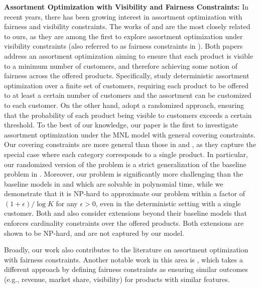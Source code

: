 \documentclass[msom,non-blindrev]{informs3} %
\theoremstyle{definition}
\begin{document}
\noindent\textbf{Assortment Optimization with Visibility and Fairness Constraints:} 
In recent years, there has been growing interest in assortment optimization with fairness and visibility constraints. The works of \cite{barre2023assortment} and \cite{lu2023simple} are the most closely related to ours, as they are among the first to explore assortment optimization under visibility constraints (also referred to as fairness constraints in \cite{lu2023simple}). Both papers address an assortment optimization  aiming to ensure that each product is visible to a minimum number of customers, and therefore achieving some notion of fairness across the offered products. Specifically, \cite{barre2023assortment} study deterministic assortment optimization over a finite set of customers, requiring each product to be offered to at least a certain number of customers and the assortment can be customized to each customer. On the other hand, \cite{lu2023simple} adopt a randomized approach, ensuring that the probability of each product being visible to customers exceeds a certain threshold.
To the best of our knowledge, our paper is the first to investigate assortment optimization under the MNL model with general covering constraints. {  Our covering constraints are more general than  those in \cite{barre2023assortment} and \cite{lu2023simple}, as they capture the special case where each category corresponds to a single product.
In particular, our randomized version of the problem is a strict generalization of the baseline problem in \cite{lu2023simple}. %
Moreover, our problem is significantly more challenging than the baseline models in \cite{barre2023assortment} and \cite{lu2023simple} which are solvable in polynomial time, while we demonstrate that it is NP-hard to approximate our problem within a factor of $(1+\epsilon)/\log K$ for any $\epsilon>0$, even in the deterministic setting with a single customer. Both \cite{barre2023assortment} and \cite{lu2023simple} also consider extensions beyond their baseline models that enforces cardinality constraints over the offered products. Both extensions are shown to be NP-hard, and are not captured by our model.}

Broadly, our work also contributes to the literature on assortment optimization with fairness constraints. Another notable work in this area is \cite{chen2022fair}, which takes a different approach by defining fairness constraints as ensuring similar outcomes (e.g., revenue, market share, visibility) for products with similar features.
\end{document}
